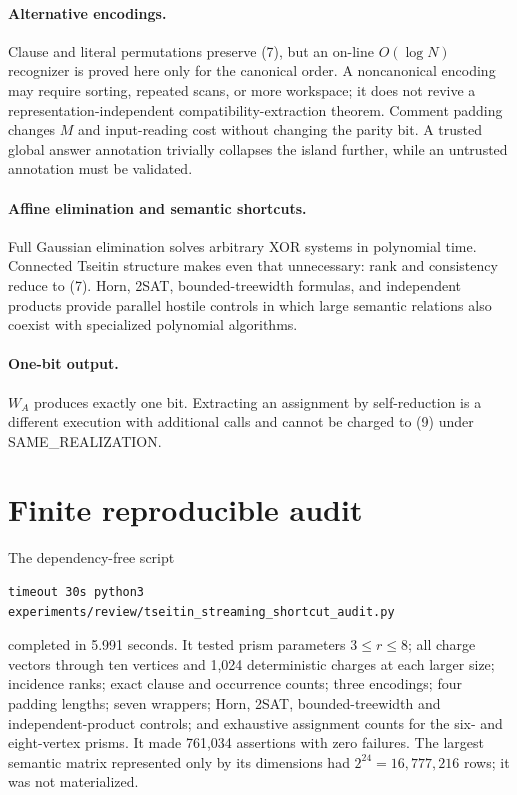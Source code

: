 \documentclass[11pt]{article}
\begin{document}
\paragraph{Alternative encodings.}
Clause and literal permutations preserve (7), but an on-line $O(\log N)$ recognizer is proved here only for the canonical order.  A noncanonical encoding may require sorting, repeated scans, or more workspace; it does not revive a representation-independent compatibility-extraction theorem.  Comment padding changes $M$ and input-reading cost without changing the parity bit.  A trusted global answer annotation trivially collapses the island further, while an untrusted annotation must be validated.

\paragraph{Affine elimination and semantic shortcuts.}
Full Gaussian elimination solves arbitrary XOR systems in polynomial time.  Connected Tseitin structure makes even that unnecessary: rank and consistency reduce to (7).  Horn, 2SAT, bounded-treewidth formulas, and independent products provide parallel hostile controls in which large semantic relations also coexist with specialized polynomial algorithms.

\paragraph{One-bit output.}
$W_A$ produces exactly one bit.  Extracting an assignment by self-reduction is a different execution with additional calls and cannot be charged to (9) under SAME\_REALIZATION.

\section{Finite reproducible audit}

The dependency-free script
\begin{verbatim}
timeout 30s python3 experiments/review/tseitin_streaming_shortcut_audit.py
\end{verbatim}
completed in 5.991 seconds.  It tested prism parameters $3\le r\le8$; all charge vectors through ten vertices and 1,024 deterministic charges at each larger size; incidence ranks; exact clause and occurrence counts; three encodings; four padding lengths; seven wrappers; Horn, 2SAT, bounded-treewidth and independent-product controls; and exhaustive assignment counts for the six- and eight-vertex prisms.  It made 761,034 assertions with zero failures.  The largest semantic matrix represented only by its dimensions had $2^{24}=16{,}777{,}216$ rows; it was not materialized.
\end{document}
